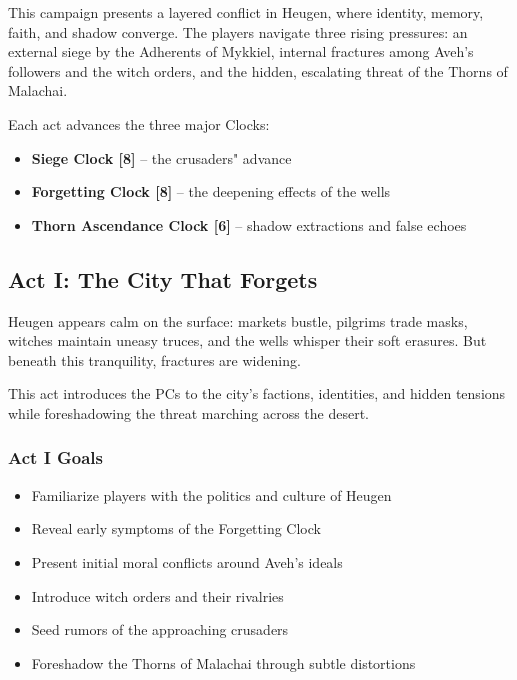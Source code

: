 \documentclass[11pt]{book}
\begin{document}
This campaign presents a layered conflict in Heugen, where identity,
memory, faith, and shadow converge. The players navigate three rising
pressures: an external siege by the Adherents of Mykkiel, internal
fractures among Aveh's followers and the witch orders, and the hidden,
escalating threat of the Thorns of Malachai.

Each act advances the three major Clocks:
\begin{itemize}[leftmargin=*]
    \item \textbf{Siege Clock [8]} -- the crusaders" advance
    \item \textbf{Forgetting Clock [8]} -- the deepening effects of the wells
    \item \textbf{Thorn Ascendance Clock [6]} -- shadow extractions and false echoes
\end{itemize}

\subsection{Act I: The City That Forgets}

Heugen appears calm on the surface: markets bustle, pilgrims trade masks,
witches maintain uneasy truces, and the wells whisper their soft erasures.
But beneath this tranquility, fractures are widening.

This act introduces the PCs to the city's factions, identities, and hidden
tensions while foreshadowing the threat marching across the desert.

\subsubsection*{Act I Goals}
\begin{itemize}[leftmargin=*]
    \item Familiarize players with the politics and culture of Heugen
    \item Reveal early symptoms of the Forgetting Clock
    \item Present initial moral conflicts around Aveh's ideals
    \item Introduce witch orders and their rivalries
    \item Seed rumors of the approaching crusaders
    \item Foreshadow the Thorns of Malachai through subtle distortions
\end{itemize}
\end{document}
